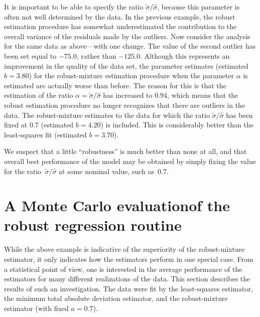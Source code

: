 \documentclass{admbmanual}
\begin{document}
It is important to be able to specify the ratio $\tilde\sigma/\hat\sigma$,
because this parameter is often not well determined by the data. In the previous
example, the robust estimation procedure has somewhat underestimated the
contribution to the overall variance of the residuals made by the outliers. Now
consider the analysis for the same data as above---with one change. The value of
the second outlier has been set equal to $-75.0$, rather than $-125.0$. Although
this represents an improvement in the quality of the data set, the parameter
estimates (estimated $b=3.80$) for the robust-mixture estimation procedure when
the parameter $\alpha$ is estimated are actually worse than before. The reason
for this is that the estimation of the ratio $\alpha=\tilde\sigma/\hat\sigma$
has increased to $0.94$, which means that the robust estimation procedure no
longer recognizes that there are outliers in the data. The robust-mixture
estimates to the data for which the ratio $\tilde\sigma/\hat\sigma$ has been
fixed at $0.7$ (estimated $b=4.20$) is included. This is considerably better
than the least-squares fit (estimated $b=3.70$).

\begin{figure}
  \centering\hskip1pt
   
   \emptycaption{}
   \label{fig:robust-nonlinear-regression-02}  %
\end{figure}

We suspect that a little ``robustness'' is much better than none at all, and
that overall best performance of the model may be obtained by simply fixing the
value for the ratio~$\tilde\sigma/\hat\sigma$ at some nominal value, such
as~$0.7$.

\section{A Monte Carlo evaluation\br of the robust regression routine}
\label{sec:monte-carlo}

While the above example is indicative of the superiority of the robust-mixture
estimator, it only indicates how the estimators perform in one special case.
From a statistical point of view, one is interested in the average performance
of the estimators for many different realizations of the data. This section
describes the results of such an investigation. The data were fit by the
least-squares estimator, the minimum total absolute deviation estimator, and the
robust-mixture estimator (with fixed $a=0.7$).
\end{document}
